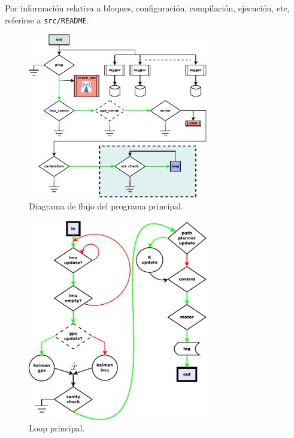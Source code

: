 \documentclass[main]{subfiles}
\begin{document}
Por información relativa a bloques, configuración, compilación, ejecución, etc, referirse a \verb+src/README+.

\vspace{-20pt}
\begin{figure}[h!]
  \centering
  \includegraphics[width=0.7\textwidth]{./pics_software/flow-main.pdf}
  \caption{Diagrama de flujo del programa principal.}
  \label{fig:software:flow-main.pdf}
\end{figure}

\begin{figure}[h!]
  \centering
  \includegraphics[width=0.7\textwidth]{./pics_software/loop-main-tight.pdf}
  \caption{Loop principal.}
  \label{fig:software:loop-main.pdf}
\end{figure}
\end{document}
